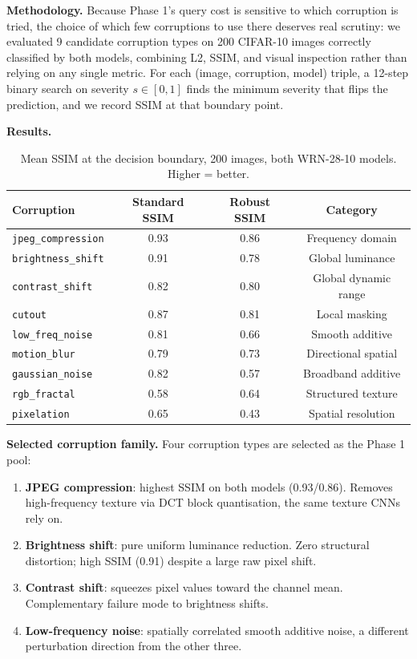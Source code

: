 \documentclass[11pt, a4paper]{article}
\begin{document}
\textbf{Methodology.} Because Phase 1's query cost is sensitive to which corruption is tried, the choice of which few corruptions to use there deserves real scrutiny: we evaluated 9 candidate corruption types on 200 CIFAR-10 images correctly classified by both models, combining L2, SSIM, and visual inspection rather than relying on any single metric. For each (image, corruption, model) triple, a 12-step binary search on severity $s \in [0,1]$ finds the minimum severity that flips the prediction, and we record SSIM at that boundary point.

\textbf{Results.}

\begin{table}[htbp]
\centering
\caption{Mean SSIM at the decision boundary, 200 images, both WRN-28-10 models. Higher = better.}
\label{tab:stage0}
\begin{tabular}{lccc}
\toprule
Corruption & Standard SSIM & Robust SSIM & Category \\
\midrule
\texttt{jpeg\_compression} & 0.93 & 0.86 & Frequency domain \\
\texttt{brightness\_shift} & 0.91 & 0.78 & Global luminance \\
\texttt{contrast\_shift}   & 0.82 & 0.80 & Global dynamic range \\
\texttt{cutout}            & 0.87 & 0.81 & Local masking \\
\texttt{low\_freq\_noise}  & 0.81 & 0.66 & Smooth additive \\
\texttt{motion\_blur}      & 0.79 & 0.73 & Directional spatial \\
\texttt{gaussian\_noise}   & 0.82 & 0.57 & Broadband additive \\
\texttt{rgb\_fractal}      & 0.58 & 0.64 & Structured texture \\
\texttt{pixelation}        & 0.65 & 0.43 & Spatial resolution \\
\bottomrule
\end{tabular}
\end{table}

\textbf{Selected corruption family.} Four corruption types are selected as the Phase 1 pool:

\begin{enumerate}[noitemsep]
  \item \textbf{JPEG compression}: highest SSIM on both models (0.93/0.86). Removes high-frequency texture via DCT block quantisation, the same texture CNNs rely on.
  \item \textbf{Brightness shift}: pure uniform luminance reduction. Zero structural distortion; high SSIM (0.91) despite a large raw pixel shift.
  \item \textbf{Contrast shift}: squeezes pixel values toward the channel mean. Complementary failure mode to brightness shifts.
  \item \textbf{Low-frequency noise}: spatially correlated smooth additive noise, a different perturbation direction from the other three.
\end{enumerate}
\end{document}
